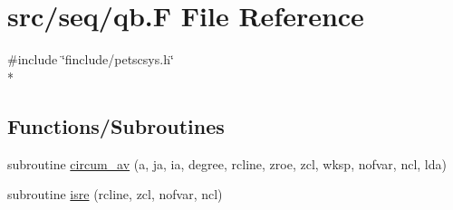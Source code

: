 \hypertarget{seq_2qb_8_f}{\section{src/seq/qb.F File Reference}
\label{seq_2qb_8_f}
}
{\ttfamily \#include \char`\"{}finclude/petscsys.\-h\char`\"{}}\\*
\subsection*{Functions/\-Subroutines}
\begin{DoxyCompactItemize}
\item 
subroutine \hyperlink{seq_2qb_8_f_a3ba42378b5c52e8619b10dbc327ea00b}{circum\-\_\-av} (a, ja, ia, degree, rcline, zroe, zcl, wksp, nofvar, ncl, lda)
\item 
subroutine \hyperlink{seq_2qb_8_f_a059e95edfb6b00db6006003d21d95a56}{isre} (rcline, zcl, nofvar, ncl)
\end{DoxyCompactItemize}


